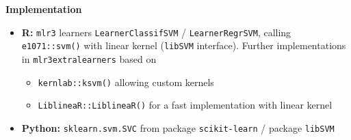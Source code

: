 \documentclass[11pt,compress,t,notes=noshow, xcolor=table]{beamer}
\newcommand{\highlight}[1]{\textcolor{hlcol}{\textbf{#1}}}
\begin{document}
\begin{vbframe}
\highlight{Implementation} 
\begin{itemize}
  \item \textbf{R:} \texttt{mlr3} learners \texttt{LearnerClassifSVM} /
  \texttt{LearnerRegrSVM}, calling \texttt{e1071::svm()} with linear kernel (\texttt{libSVM} interface).
  Further implementations in \texttt{mlr3extralearners} based on
  \begin{itemize}
      \item \texttt{kernlab::ksvm()} allowing custom kernels
      \item \texttt{LiblineaR::LiblineaR()} for a fast implementation with linear kernel
  \end{itemize}
  \item \textbf{Python:} \texttt{sklearn.svm.SVC} from package 
  \texttt{scikit-learn} / package \texttt{libSVM}
\end{itemize}
\end{vbframe}
\end{document}
